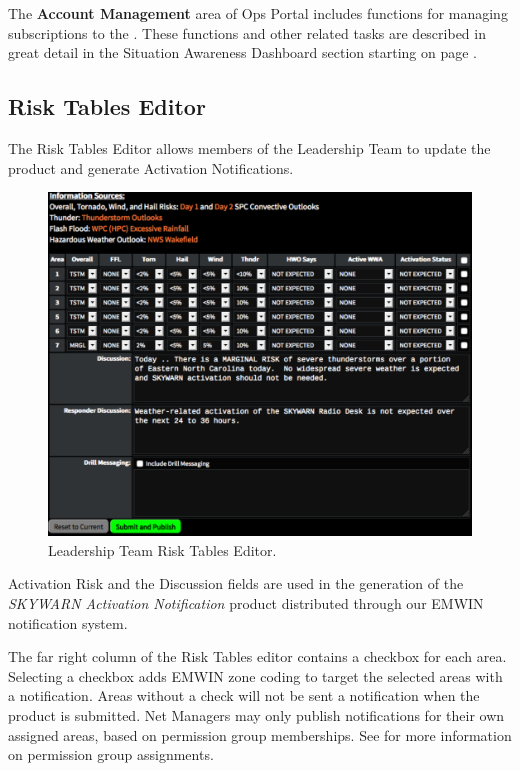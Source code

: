\documentclass[pdflatex,letterpaper,twoside,12pt]{book}
\begin{document}
The \textbf{Account Management} area of Ops Portal includes functions for managing subscriptions to the .  These functions and other related tasks are described in great detail in the Situation Awareness Dashboard  section starting on page \pageref{sit-leadership-functions}.

\subsection{Risk Tables Editor}\label{ops-risk-tables-editor}

The Risk Tables Editor allows members of the Leadership Team to update the  product and generate Activation Notifications.

\begin{figure}[h]
  \centering
  \includegraphics[width=\textwidth,keepaspectratio=true]{img/ops-risk-tables-editor}
  \caption{Leadership Team Risk Tables Editor.\label{fig:ops-risk-tables-editor}}
\end{figure}

Activation Risk and the Discussion fields are used in the generation of the \emph{SKYWARN Activation Notification} product distributed through our EMWIN notification system.

The far right column of the Risk Tables editor contains a checkbox for each area.  Selecting a checkbox adds EMWIN zone coding to target the selected areas with a notification.  Areas without a check will not be sent a notification when the product is submitted.  Net Managers may only publish notifications for their own assigned areas, based on permission group memberships.  See  for more information on permission group assignments.
\end{document}
